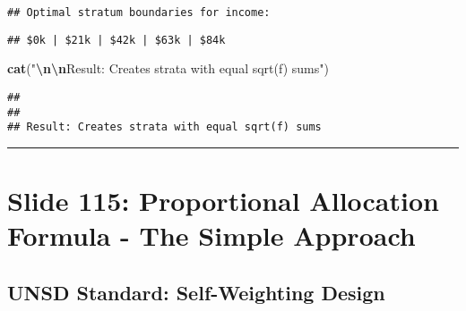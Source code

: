 \documentclass[
]{article}
\newenvironment{Shaded}{\begin{snugshade}}{\end{snugshade}}
\newcommand{\AttributeTok}[1]{\textcolor[rgb]{0.13,0.29,0.53}{#1}}
\newcommand{\DecValTok}[1]{\textcolor[rgb]{0.00,0.00,0.81}{#1}}
\newcommand{\FunctionTok}[1]{\textcolor[rgb]{0.13,0.29,0.53}{\textbf{#1}}}
\newcommand{\NormalTok}[1]{#1}
\newcommand{\SpecialCharTok}[1]{\textcolor[rgb]{0.81,0.36,0.00}{\textbf{#1}}}
\newcommand{\StringTok}[1]{\textcolor[rgb]{0.31,0.60,0.02}{#1}}
\begin{document}
\begin{verbatim}
## Optimal stratum boundaries for income:
\end{verbatim}

\begin{Shaded}
\end{Shaded}

\begin{verbatim}
## $0k | $21k | $42k | $63k | $84k
\end{verbatim}

\begin{Shaded}
\begin{Highlighting}[]
\FunctionTok{cat}\NormalTok{(}\StringTok{"}\SpecialCharTok{\textbackslash{}n\textbackslash{}n}\StringTok{Result: Creates strata with equal sqrt(f) sums"}\NormalTok{)}
\end{Highlighting}
\end{Shaded}

\begin{verbatim}
## 
## 
## Result: Creates strata with equal sqrt(f) sums
\end{verbatim}

\begin{center}\rule{0.5\linewidth}{0.5pt}\end{center}

\section{Slide 115: Proportional Allocation Formula - The Simple
Approach}\label{slide-115-proportional-allocation-formula---the-simple-approach}

\subsection{UNSD Standard: Self-Weighting
Design}\label{unsd-standard-self-weighting-design}
\end{document}

